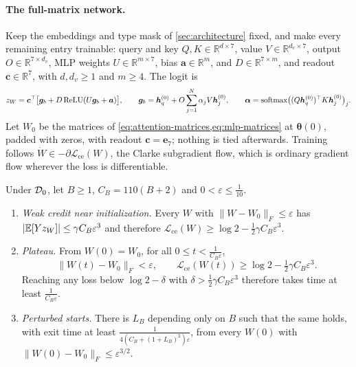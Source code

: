 \paragraph{The full-matrix network.} Keep the embeddings and type mask of \cref{sec:architecture} fixed, and make every remaining entry trainable:
query and key $Q,K\in\mathbb R^{d\times7}$, value $V\in\mathbb R^{d_v\times7}$, output $O\in\mathbb R^{7\times d_v}$, MLP weights $U\in\mathbb R^{m\times7}$, bias $\bm a\in\mathbb R^m$,
and $D\in\mathbb R^{7\times m}$, and readout $\bm c\in\mathbb R^7$, with $d,d_v\ge1$ and $m\ge4$. The logit is
\[
 z_W=\bm c^\top\bigl[\bm g_b+D\operatorname{ReLU}(U\bm g_b+\bm a)\bigr],\qquad
 \bm g_b=\bm h_q^{(0)}+O\sum_{j=1}^N\alpha_jV\bm h_j^{(0)},\qquad
 \bm\alpha=\operatorname{softmax}\bigl((Q\bm h_q^{(0)})^\top K\bm h_j^{(0)}\bigr)_j .
\]
Let $W_0$ be the matrices of \cref{eq:attention-matrices,eq:mlp-matrices} at $\bm\theta(0)$, padded with zeros, with readout $\bm c=\bm e_7$; nothing is tied afterwards.
Training follows $\dot W\in-\partial\mathcal L_{\mathrm{ce}}(W)$, the Clarke subgradient flow, which is ordinary gradient flow wherever the loss is differentiable.

\begin{mainresult}
\begin{theorem}
\label{thm:fullmatrix}
Under $\mathcal D_{0}$, let $B\ge1$, $C_B=110(B+2)$ and $0<\varepsilon\le\tfrac{1}{10}$.
\begin{enumerate}[label=(\roman*),leftmargin=*,itemsep=2pt,topsep=2pt]
\item \emph{Weak credit near initialization.} Every $W$ with $\|W-W_0\|_F\le\varepsilon$ has
$|\mathbb E[Yz_W]|\le\gamma C_B\varepsilon^3$ and therefore $\mathcal L_{\mathrm{ce}}(W)\ge\log2-\tfrac12\gamma C_B\varepsilon^3$.
\item \emph{Plateau.} From $W(0)=W_0$, for all $0\le t<\tfrac{1}{C_B\varepsilon}$,
\[
 \|W(t)-W_0\|_F<\varepsilon,\qquad \mathcal L_{\mathrm{ce}}(W(t))\ge\log2-\tfrac12\gamma C_B\varepsilon^3 .
\]
Reaching any loss below $\log2-\delta$ with $\delta>\tfrac12\gamma C_B\varepsilon^3$ therefore takes time at least $\tfrac{1}{C_B\varepsilon}$.
\item \emph{Perturbed starts.} There is $L_B$ depending only on $B$ such that the same holds, with exit time at least $\tfrac{1}{4(C_B+(1+L_B)^2)\varepsilon}$,
from every $W(0)$ with $\|W(0)-W_0\|_F\le\varepsilon^{3/2}$.
\end{enumerate}
\end{theorem}
\end{mainresult}

